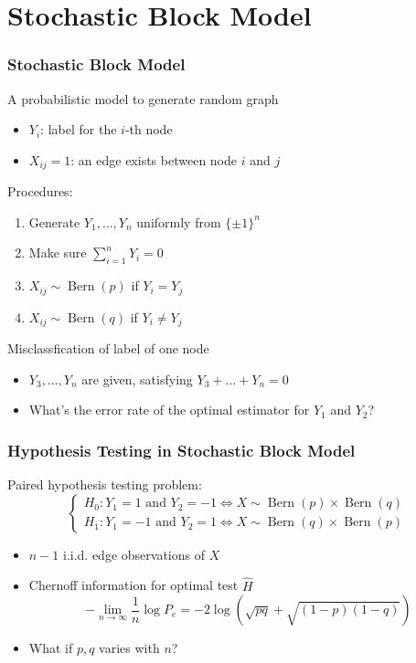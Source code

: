 \documentclass{beamer}
\DeclareMathOperator{\Bern}{Bern}
\begin{document}
\section{Stochastic Block Model}
\begin{frame}
\frametitle{
Stochastic Block Model} A probabilistic model to generate random graph
\begin{itemize}
\item $Y_i$: label for the $i$-th node
\item $X_{ij}=1$: an edge exists between node $i$ and $j$
\end{itemize}
Procedures:
\begin{enumerate}
\item Generate $Y_1, \dots, Y_n$ uniformly from $\{\pm 1\}^n$
\item Make sure $\sum_{i=1}^n Y_i = 0$
\item $X_{ij} \sim \Bern(p) $ if $Y_i=Y_j$
\item $X_{ij} \sim \Bern(q) $ if $Y_i \neq Y_j$
\end{enumerate}
Misclassfication of label of one node
\begin{itemize}
\item $Y_3, \dots, Y_n$ are given, satisfying $Y_3 + \dots + Y_n  = 0$
\item What's the error rate of the optimal estimator for $Y_1$ and $Y_2$?
\end{itemize}
\end{frame}
\begin{frame}
\frametitle{
Hypothesis Testing in Stochastic Block Model} 
Paired hypothesis testing problem:
\begin{equation*}
\begin{cases}
H_0: Y_1 = 1 \textrm{ and } Y_2 = -1 \iff X \sim \Bern(p) \times \Bern(q)\\
H_1: Y_1 = -1 \textrm{ and } Y_2 = 1 \iff X \sim \Bern(q) \times \Bern(p)
\end{cases}
\end{equation*}
\begin{itemize}
\item $n-1$ i.i.d. edge observations of $X$
\item Chernoff information for optimal test $\widehat{H}$
\begin{equation*}
-\lim_{n\to\infty} \frac{1}{n}\log P_e = -2 \log (\sqrt{pq}+\sqrt{(1-p)(1-q)})
\end{equation*}
\item What if $p,q$ varies with $n$?
\end{itemize}
\end{frame}
\end{document}
